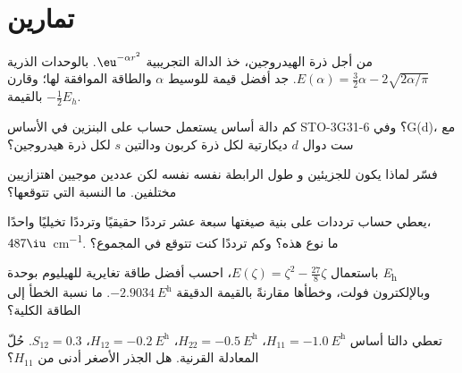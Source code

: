 \section{تمارين}

\begin{exercise}[$\star$]\label{exo:b3:computational-chemistry:1}
من أجل ذرة الهيدروجين، خذ الدالة التجريبية $\eu^{-\alpha r^2}$. بالوحدات
الذرية $E(\alpha) = \frac32\alpha - 2\sqrt{2\alpha/\pi}$. جد أفضل قيمة للوسيط $\alpha$ 
والطاقة الموافقة لها؛ وقارن بالقيمة $-\frac12E_h$.
\end{exercise}

\begin{exercise}[$\star$]\label{exo:b3:computational-chemistry:2}
كم دالة أساس يستعمل حساب على البنزين في الأساس STO-3G؟
وفي 6-31G(d)، مع ست دوال $d$ ديكارتية لكل ذرة كربون ودالتين $s$
لكل ذرة هيدروجين؟
\end{exercise}

\begin{exercise}[$\star$]\label{exo:b3:computational-chemistry:3}
فسّر لماذا يكون للجزيئين  و طول الرابطة نفسه 
نفسه لكن عددين موجيين اهتزازيين مختلفين. ما النسبة التي تتوقعها؟
\end{exercise}

\begin{exercise}[$\star$]\label{exo:b3:computational-chemistry:4}
يعطي حساب ترددات على بنية صيغتها  سبعة عشر ترددًا حقيقيًا
وترددًا تخيليًا واحدًا، $487\iu$~\unit{cm^{-1}}. ما نوع
 هذه؟ وكم ترددًا كنت تتوقع في المجموع؟
\end{exercise}

\begin{exercise}[$\star\star$]\label{exo:b3:computational-chemistry:5}
باستعمال $E(\zeta) = \zeta^2 - \frac{27}{8}\zeta$، احسب أفضل طاقة تغايرية
للهيليوم بوحدة \unit{\hartree} وبالإلكترون فولت، وخطأها مقارنةً بالقيمة الدقيقة
$\qty{-2.9034}{\hartree}$. ما نسبة الخطأ إلى الطاقة الكلية؟
\end{exercise}

\begin{exercise}[$\star\star$]\label{exo:b3:computational-chemistry:6}
تعطي دالتا أساس $H_{11} = \qty{-1.0}{\hartree}$، $H_{22} =
\qty{-0.5}{\hartree}$، $H_{12} = \qty{-0.2}{\hartree}$، $S_{12} = 0.3$. حُلّ
المعادلة القرنية. هل الجذر الأصغر أدنى من $H_{11}$؟
\end{exercise}

